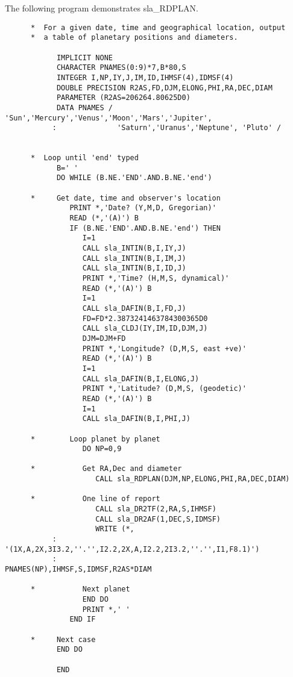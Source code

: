 \documentclass[11pt,twoside]{article}
\begin{document}
The following program demonstrates
sla\_RDPLAN.
\begin{verbatim}
      *  For a given date, time and geographical location, output
      *  a table of planetary positions and diameters.

            IMPLICIT NONE
            CHARACTER PNAMES(0:9)*7,B*80,S
            INTEGER I,NP,IY,J,IM,ID,IHMSF(4),IDMSF(4)
            DOUBLE PRECISION R2AS,FD,DJM,ELONG,PHI,RA,DEC,DIAM
            PARAMETER (R2AS=206264.80625D0)
            DATA PNAMES / 'Sun','Mercury','Venus','Moon','Mars','Jupiter',
           :              'Saturn','Uranus','Neptune', 'Pluto' /


      *  Loop until 'end' typed
            B=' '
            DO WHILE (B.NE.'END'.AND.B.NE.'end')

      *     Get date, time and observer's location
               PRINT *,'Date? (Y,M,D, Gregorian)'
               READ (*,'(A)') B
               IF (B.NE.'END'.AND.B.NE.'end') THEN
                  I=1
                  CALL sla_INTIN(B,I,IY,J)
                  CALL sla_INTIN(B,I,IM,J)
                  CALL sla_INTIN(B,I,ID,J)
                  PRINT *,'Time? (H,M,S, dynamical)'
                  READ (*,'(A)') B
                  I=1
                  CALL sla_DAFIN(B,I,FD,J)
                  FD=FD*2.3873241463784300365D0
                  CALL sla_CLDJ(IY,IM,ID,DJM,J)
                  DJM=DJM+FD
                  PRINT *,'Longitude? (D,M,S, east +ve)'
                  READ (*,'(A)') B
                  I=1
                  CALL sla_DAFIN(B,I,ELONG,J)
                  PRINT *,'Latitude? (D,M,S, (geodetic)'
                  READ (*,'(A)') B
                  I=1
                  CALL sla_DAFIN(B,I,PHI,J)

      *        Loop planet by planet
                  DO NP=0,9

      *           Get RA,Dec and diameter
                     CALL sla_RDPLAN(DJM,NP,ELONG,PHI,RA,DEC,DIAM)

      *           One line of report
                     CALL sla_DR2TF(2,RA,S,IHMSF)
                     CALL sla_DR2AF(1,DEC,S,IDMSF)
                     WRITE (*,
           : '(1X,A,2X,3I3.2,''.'',I2.2,2X,A,I2.2,2I3.2,''.'',I1,F8.1)')
           :                          PNAMES(NP),IHMSF,S,IDMSF,R2AS*DIAM

      *           Next planet
                  END DO
                  PRINT *,' '
               END IF

      *     Next case
            END DO

            END
\end{verbatim}
\end{document}
